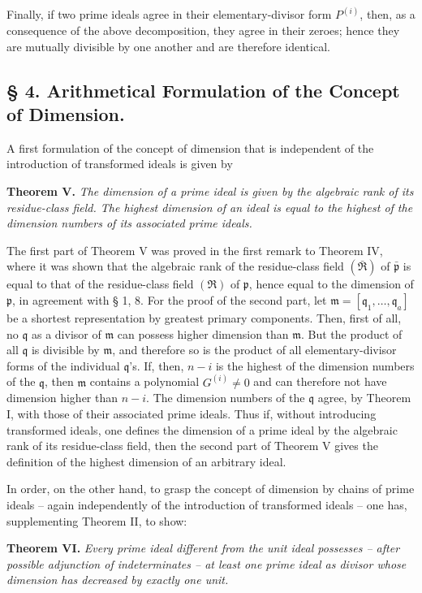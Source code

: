 \documentclass[11pt]{article}
\providecommand{\mR}{\mathfrak{R}}
\providecommand{\frakm}{\mathfrak m}
\providecommand{\frakp}{\mathfrak p}
\providecommand{\frakq}{\mathfrak q}
\providecommand{\mR}{\mathfrak{R}}
\providecommand{\frakp}{\mathfrak p}
\providecommand{\frakp}{\mathfrak p}
\providecommand{\frakq}{\mathfrak q}
\begin{document}
Finally, if two prime ideals agree in their elementary-divisor form $P^{(i)}$, then, as a consequence of the above decomposition, they agree in their zeroes; hence they are mutually divisible by one another and are therefore identical.

\subsection*{§ 4. Arithmetical Formulation of the Concept of Dimension.}

A first formulation of the concept of dimension that is independent of the introduction of transformed ideals is given by

\textbf{Theorem V.} \emph{The dimension of a prime ideal is given by the algebraic rank of its residue-class field. The highest dimension of an ideal is equal to the highest of the dimension numbers of its associated prime ideals.}

The first part of Theorem V was proved in the first remark to Theorem IV, where it was shown that the algebraic rank of the residue-class field $(\bar{\mR})$ of $\bar{\frakp}$ is equal to that of the residue-class field $(\mR)$ of $\frakp$, hence equal to the dimension of $\frakp$, in agreement with § 1, 8. For the proof of the second part, let $\frakm=[\frakq_1,\ldots,\frakq_a]$ be a shortest representation by greatest primary components. Then, first of all, no $\frakq$ as a divisor of $\frakm$ can possess higher dimension than $\frakm$. But the product of all $\frakq$ is divisible by $\frakm$, and therefore so is the product of all elementary-divisor forms of the individual $\frakq$'s. If, then, $n-i$ is the highest of the dimension numbers of the $\frakq$, then $\frakm$ contains a polynomial $G^{(i)}\ne0$ and can therefore not have dimension higher than $n-i$. The dimension numbers of the $\frakq$ agree, by Theorem I, with those of their associated prime ideals. Thus if, without introducing transformed ideals, one defines the dimension of a prime ideal by the algebraic rank of its residue-class field, then the second part of Theorem V gives the definition of the highest dimension of an arbitrary ideal.

In order, on the other hand, to grasp the concept of dimension by chains of prime ideals -- again independently of the introduction of transformed ideals -- one has, supplementing Theorem II, to show:

\textbf{Theorem VI.} \emph{Every prime ideal different from the unit ideal possesses -- after possible adjunction of indeterminates -- at least one prime ideal as divisor whose dimension has decreased by exactly one unit.}
\end{document}
